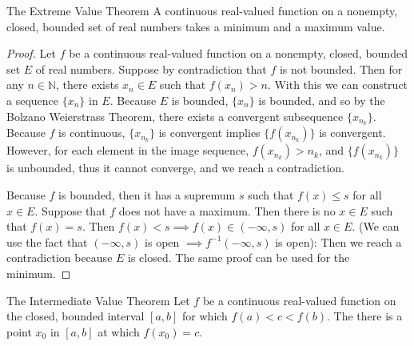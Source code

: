 \begin{flushleft}
\begin{namedthm*}{The Extreme Value Theorem}
	A continuous real-valued function on a nonempty, closed, bounded set of real numbers takes a minimum and a maximum value.	
\end{namedthm*}
\begin{proof}
	Let $f$ be a continuous real-valued function on a nonempty, closed, bounded set $E$ of real numbers.
	Suppose by contradiction that $f$ is not bounded.
	Then for any $n \in \mathbb{N}$, there exists $x_n \in E$ such that $f(x_n) > n$.
	With this we can construct a sequence $\{x_n\}$ in $E$. Because $E$ is bounded, $\{x_n\}$ is bounded, and so by the Bolzano Weierstrass Theorem, there exists a convergent subsequence $\{x_{n_k}\}$.
	Because $f$ is continuous, $\{x_{n_k}\}$ is convergent implies $\{f(x_{n_k})\}$ is convergent.
	However, for each element in the image sequence, $f(x_{n_k})>n_k$, and $\{f(x_{n_k})\}$ is unbounded, thus it cannot converge, and we reach a contradiction.\par
	Because $f$ is bounded, then it has a supremum $s$ such that $f(x) \le s$ for all $x \in E$.
	Suppose that $f$ does not have a maximum. Then there is no $x \in E$ such that $f(x)=s$.
	Then $f(x) < s \implies f(x) \in (-\infty,s)$ for all $x \in E$.
	(We can use the fact that $(-\infty,s)$ is open $\implies f^{-1}(-\infty,s)$ is open):
	Then we reach a contradiction because $E$ is closed. The same proof can be used for the minimum.
\end{proof}

\begin{namedthm*}{The Intermediate Value Theorem}
	Let $f$ be a continuous real-valued function on the closed, bounded interval $[a,b]$ for which $f(a)<c<f(b)$.
	The there is a point $x_0$ in $[a,b]$ at which $f(x_0)=c$.
\end{namedthm*}


\end{flushleft}
